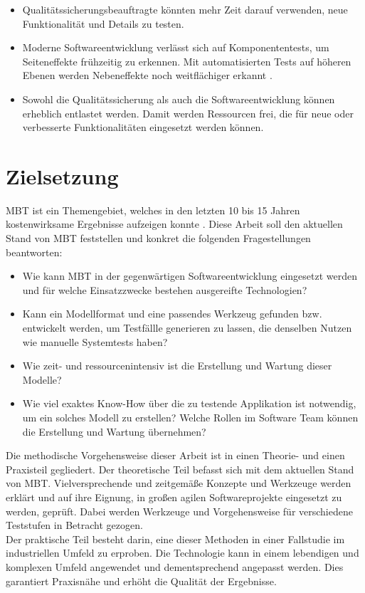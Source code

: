 \begin{itemize}
	\item Qualitätssicherungsbeauftragte könnten mehr Zeit darauf verwenden, neue Funktionalität und Details zu testen.
	\item Moderne Softwareentwicklung verlässt sich auf Komponententests, um Seiteneffekte  frühzeitig zu erkennen. Mit automatisierten Tests auf höheren Ebenen werden Nebeneffekte noch weitflächiger erkannt \cite{pol_management_2002}.
	\item Sowohl die Qualitätssicherung als auch die Softwareentwicklung können erheblich entlastet werden. Damit werden Ressourcen frei, die für neue oder verbesserte Funktionalitäten eingesetzt werden können.
\end{itemize}

\section{Zielsetzung}

\Gls{MBT} ist ein Themengebiet, welches in den letzten 10 bis 15 Jahren kostenwirksame Ergebnisse aufzeigen konnte \cite{utting_practical_2007}. Diese Arbeit soll den aktuellen Stand von \Gls{MBT} feststellen und konkret die folgenden Fragestellungen beantworten:

\begin{itemize}
	\item Wie kann \Gls{MBT} in der gegenwärtigen Softwareentwicklung eingesetzt werden und für welche Einsatzzwecke bestehen ausgereifte Technologien?
	\item Kann ein Modellformat und eine passendes Werkzeug gefunden bzw. entwickelt werden, um Testfällle generieren zu lassen, die denselben Nutzen wie manuelle Systemtests haben?
	\item Wie zeit- und ressourcenintensiv ist die Erstellung und Wartung dieser Modelle?
	\item Wie viel exaktes Know-How über die zu testende Applikation ist notwendig, um ein solches Modell zu erstellen? Welche Rollen im Software Team können die Erstellung und Wartung übernehmen?
\end{itemize}

Die methodische Vorgehensweise dieser Arbeit ist in einen Theorie- und einen Praxisteil gegliedert. Der theoretische Teil befasst sich mit dem aktuellen Stand von \Gls{MBT}. Vielversprechende und zeitgemäße Konzepte und Werkzeuge werden erklärt und auf ihre Eignung, in großen agilen Softwareprojekte eingesetzt zu werden, geprüft. Dabei werden Werkzeuge und Vorgehensweise für verschiedene Teststufen in Betracht gezogen.\\
Der praktische Teil besteht darin, eine dieser Methoden in einer Fallstudie im industriellen Umfeld zu erproben. Die Technologie kann in einem lebendigen und komplexen Umfeld angewendet und dementsprechend angepasst werden. Dies garantiert Praxisnähe und erhöht die Qualität der Ergebnisse.

